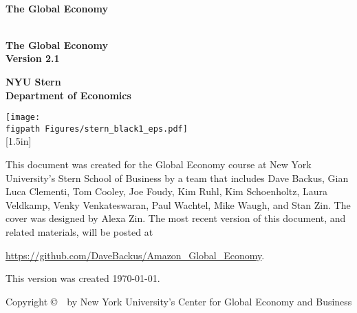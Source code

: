 \begin{titlepage}

\begin{center}
\textsc{}\\[1.5in]
{\Huge\bf\sffamily The Global Economy} \\ [0.5in]
\end{center}

\pagebreak
\phantom{x}
\thispagestyle{empty}

\pagebreak
\thispagestyle{empty}
\begin{center}
\textsc{}\\[1.5in]
{\Huge\bf\sffamily The Global Economy} \\ [0.25in]
{\huge\bf\sffamily Version 2.1}

\vspace*{1.00in}
{\huge\bf\sffamily NYU Stern}\\[1ex]
{\huge\bf\sffamily Department of  Economics}


\vfill
{\texttt{[image: \\figpath Figures/stern\_black1\_eps.pdf]}\\
[1.5in]
}
\end{center}


\newpage
\thispagestyle{empty}
\phantom{x}
\vfill
This document was created for the Global Economy course at New York
University's Stern School of Business by a team that includes
Dave Backus, Gian Luca Clementi, Tom Cooley, Joe Foudy, Kim Ruhl,
Kim Schoenholtz, Laura Veldkamp, Venky Venkateswaran, Paul Wachtel, Mike Waugh,
and Stan Zin.
The cover was designed by Alexa Zin.
The most recent version of this document, and related materials,
will be posted at

\vspace*{\parskip}
\centerline{\url{https://github.com/DaveBackus/Amazon_Global_Economy}.}

This version was created \today.

Copyright \copyright \ \number\year \ by New York University's Center for Global Economy and Business


\end{titlepage}
